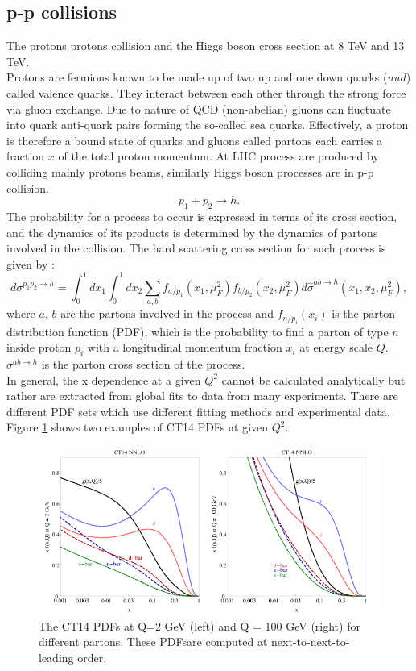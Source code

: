 \subsection{p-p collisions}
\label{chap1:H2012:PP}
The protons protons collision and the Higgs boson cross section at 8 TeV and 13 TeV. \\
Protons are fermions known to be made up of two up and one down quarks ($uud$) called valence quarks. They interact between each other through the strong force via gluon exchange. Due to nature of QCD (non-abelian) gluons can fluctuate into quark anti-quark pairs forming the so-called sea quarks. Effectively, a proton is therefore a bound state of quarks and gluons called partons each carries a fraction $x$ of the total proton momentum. At LHC process are produced by colliding mainly protons beams, similarly Higgs boson processes are in p-p collision.
\begin{equation}
    p_1 + p_2 \rightarrow h.
\end{equation}
The probability for a process to occur is expressed in terms of its cross section, and the dynamics of its products is determined by the dynamics of partons involved in the collision. The hard scattering cross section for such process is given by :
\begin{equation}
    d \sigma^{p_{1} p_{2} \rightarrow h}=\int_{0}^{1} d x_{1} \int_{0}^{1} d x_{2} \sum_{a, b} f_{a / p_{1}}\left(x_{1}, \mu_{F}^{2}\right) f_{b / p_{2}}\left(x_{2}, \mu_{F}^{2}\right) d \hat{\sigma}^{a b \rightarrow h}\left(x_1, x_2, \mu_{F}^{2}\right), 
\end{equation}
where $a$, $b$ are the partons involved in the process and $f_{n/p_i}(x_i)$ is the parton distribution function (PDF), which is the probability to find a parton of type $n$ inside proton $p_i$ with a longitudinal momentum fraction $x_i$ at energy scale $Q$. $\sigma^{a b \rightarrow h}$ is the parton cross section of the process. \\
In general, the x dependence at a given $Q^2$ cannot be calculated analytically but rather are extracted from global fits to data from many experiments. There are different PDF sets which use different fitting methods and experimental data. Figure \ref{fig:chap1:H2012:PDF} shows two examples of CT14 PDFs at given $Q^2$. 
\begin{figure}[ht]
    \centering
    \includegraphics[width=\textwidth]{Ch1/Img/PDFs.png}
    \caption{The CT14 PDFs at Q=2 GeV (left) and Q = 100 GeV (right) for different partons. These PDFsare computed at next-to-next-to-leading order.}
    \label{fig:chap1:H2012:PDF}
\end{figure}
